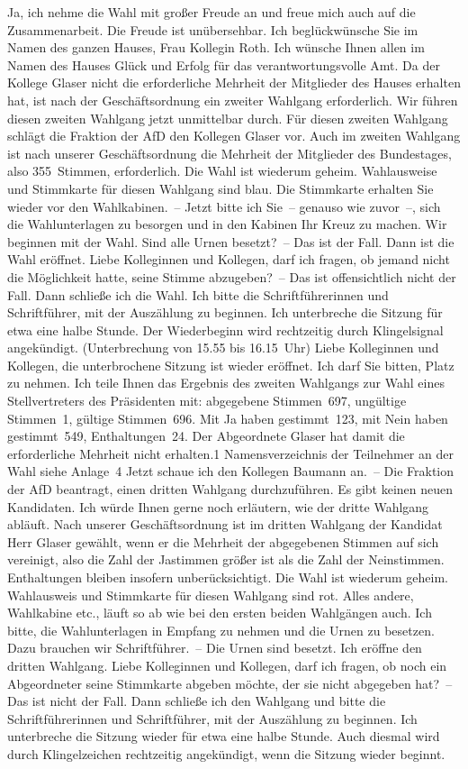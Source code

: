 \documentclass[10pt, a4paper]{report}
\begin{document}
Ja, ich nehme die Wahl mit großer Freude an und freue mich auch auf die Zusammenarbeit. Die Freude ist unübersehbar. Ich beglückwünsche Sie im Namen des ganzen Hauses, Frau Kollegin Roth. Ich wünsche Ihnen allen im Namen des Hauses Glück und Erfolg für das verantwortungsvolle Amt. Da der Kollege Glaser nicht die erforderliche Mehrheit der Mitglieder des Hauses erhalten hat, ist nach der Geschäftsordnung ein zweiter Wahlgang erforderlich. Wir führen diesen zweiten Wahlgang jetzt unmittelbar durch. Für diesen zweiten Wahlgang schlägt die Fraktion der AfD den Kollegen Glaser vor. Auch im zweiten Wahlgang ist nach unserer Geschäftsordnung die Mehrheit der Mitglieder des Bundestages, also 355 Stimmen, erforderlich. Die Wahl ist wiederum geheim. Wahlausweise und Stimmkarte für diesen Wahlgang sind blau. Die Stimmkarte erhalten Sie wieder vor den Wahlkabinen. – Jetzt bitte ich Sie – genauso wie zuvor –, sich die Wahlunterlagen zu besorgen und in den Kabinen Ihr Kreuz zu machen. Wir beginnen mit der Wahl. Sind alle Urnen besetzt? – Das ist der Fall. Dann ist die Wahl eröffnet. Liebe Kolleginnen und Kollegen, darf ich fragen, ob jemand nicht die Möglichkeit hatte, seine Stimme abzugeben? – Das ist offensichtlich nicht der Fall. Dann schließe ich die Wahl. Ich bitte die Schriftführerinnen und Schriftführer, mit der Auszählung zu beginnen. Ich unterbreche die Sitzung für etwa eine halbe Stunde. Der Wiederbeginn wird rechtzeitig durch Klingelsi­gnal angekündigt. (Unterbrechung von 15.55 bis 16.15 Uhr) Liebe Kolleginnen und Kollegen, die unterbrochene Sitzung ist wieder eröffnet. Ich darf Sie bitten, Platz zu nehmen. Ich teile Ihnen das Ergebnis des zweiten Wahlgangs zur Wahl eines Stellvertreters des Präsidenten mit: abgegebene Stimmen 697, ungültige Stimmen 1, gültige Stimmen 696. Mit Ja haben gestimmt 123, mit Nein haben gestimmt 549, Enthaltungen 24. Der Abgeordnete Glaser hat damit die erforderliche Mehrheit nicht erhalten.1  Namensverzeichnis der Teilnehmer an der Wahl siehe Anlage 4 Jetzt schaue ich den Kollegen Baumann an. – Die Fraktion der AfD beantragt, einen dritten Wahlgang durchzuführen. Es gibt keinen neuen Kandidaten. Ich würde Ihnen gerne noch erläutern, wie der dritte Wahlgang abläuft. Nach unserer Geschäftsordnung ist im dritten Wahlgang der Kandidat Herr Glaser gewählt, wenn er die Mehrheit der abgegebenen Stimmen auf sich vereinigt, also die Zahl der Jastimmen größer ist als die Zahl der Neinstimmen. Enthaltungen bleiben insofern unberücksichtigt. Die Wahl ist wiederum geheim. Wahlausweis und Stimmkarte für diesen Wahlgang sind rot. Alles andere, Wahlkabine etc., läuft so ab wie bei den ersten beiden Wahlgängen auch. Ich bitte, die Wahlunterlagen in Empfang zu nehmen und die Urnen zu besetzen. Dazu brauchen wir Schriftführer. – Die Urnen sind besetzt. Ich eröffne den dritten Wahlgang. Liebe Kolleginnen und Kollegen, darf ich fragen, ob noch ein Abgeordneter seine Stimmkarte abgeben möchte, der sie nicht abgegeben hat? – Das ist nicht der Fall. Dann schließe ich den Wahlgang und bitte die Schriftführerinnen und Schriftführer, mit der Auszählung zu beginnen. Ich unterbreche die Sitzung wieder für etwa eine halbe Stunde. Auch diesmal wird durch Klingelzeichen rechtzeitig angekündigt, wenn die Sitzung wieder beginnt. 
\end{document}
